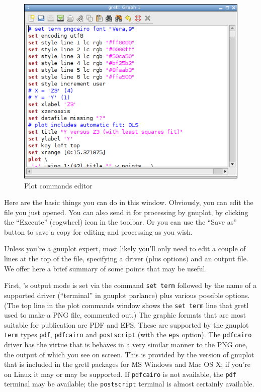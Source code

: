 \begin{figure}[htbp]
  \centering
  \includegraphics[scale=0.6]{figures/plotedit}
  \caption{Plot commands editor}
  \label{fig:plot-edit}
\end{figure}

Here are the basic things you can do in this window.  Obviously, you
can edit the file you just opened.  You can also send it for
processing by gnuplot, by clicking the ``Execute'' (cogwheel)
icon in the toolbar.  Or you can use the ``Save as'' button to save
a copy for editing and processing as you wish.

Unless you're a gnuplot expert, most likely you'll only need to edit a
couple of lines at the top of the file, specifying a driver (plus
options) and an output file.  We offer here a brief summary of some
points that may be useful.

First, 's output mode is set via the command \texttt{set
  term} followed by the name of a supported driver (``terminal'' in
gnuplot parlance) plus various possible options.  (The top line in the
plot commands window shows the \texttt{set term} line that gretl
used to make a PNG file, commented out.)  The graphic formats that are
most suitable for publication are PDF and EPS.  These are supported by
the gnuplot \texttt{term} types \texttt{pdf}, \texttt{pdfcairo} and
\texttt{postscript} (with the \texttt{eps} option).  The
\texttt{pdfcairo} driver has the virtue that is behaves in a very
similar manner to the PNG one, the output of which you see on screen.
This is provided by the version of gnuplot that is included in the
gretl packages for MS Windows and Mac OS X; if you're on Linux
it may or may be supported.  If \texttt{pdfcairo} is not available,
the \texttt{pdf} terminal may be available; the \texttt{postscript}
terminal is almost certainly available.

